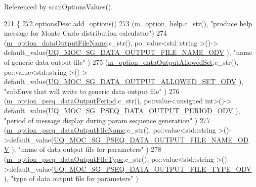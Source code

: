 Referenced by scan\-Options\-Values().


\begin{DoxyCode}
271 \{
272   optionsDesc.add\_options()     
273     (\hyperlink{class_q_u_e_s_o_1_1_monte_carlo_s_g_options_a604e9d58aa974b08eb38d70199c5d654}{m\_option\_help}.c\_str(),                                                                   
                                               \textcolor{stringliteral}{"produce help message for Monte Carlo distribution calculator"})
274     (\hyperlink{class_q_u_e_s_o_1_1_monte_carlo_s_g_options_a057b072e55710c5effa4a5016e1d93ab}{m\_option\_dataOutputFileName}.c\_str(),        po::value<std::string >()->
      default\_value(\hyperlink{_monte_carlo_s_g_options_8h_aa5ec0a1554b6c12eaa270131024b29b7}{UQ\_MOC\_SG\_DATA\_OUTPUT\_FILE\_NAME\_ODV}       ), \textcolor{stringliteral}{"name of generic
       data output file"}                            )
275     (\hyperlink{class_q_u_e_s_o_1_1_monte_carlo_s_g_options_a169218cf0b3d8d8035bb826a963f5e11}{m\_option\_dataOutputAllowedSet}.c\_str(),      po::value<std::string >()->
      default\_value(\hyperlink{_monte_carlo_s_g_options_8h_aa0fd860d2c6fd2693213b91c9bf69fcf}{UQ\_MOC\_SG\_DATA\_OUTPUT\_ALLOWED\_SET\_ODV}     ), \textcolor{stringliteral}{"subEnvs that
       will write to generic data output file"}         )
276     (\hyperlink{class_q_u_e_s_o_1_1_monte_carlo_s_g_options_a38f56157a49d08a3fd6a837d95250f8b}{m\_option\_pseq\_dataOutputPeriod}.c\_str(),     po::value<unsigned int>()->
      default\_value(\hyperlink{_monte_carlo_s_g_options_8h_ad65a13367ee1f95b0ddc5fca2f6dbf95}{UQ\_MOC\_SG\_PSEQ\_DATA\_OUTPUT\_PERIOD\_ODV}     ), \textcolor{stringliteral}{"period of
       message display during param sequence generation"}  )
277     (\hyperlink{class_q_u_e_s_o_1_1_monte_carlo_s_g_options_a52759ecc968b903de4d651127f6e9a03}{m\_option\_pseq\_dataOutputFileName}.c\_str(),   po::value<std::string >()-
      >default\_value(\hyperlink{_monte_carlo_s_g_options_8h_a773952b5a26845f50d913143236adbdf}{UQ\_MOC\_SG\_PSEQ\_DATA\_OUTPUT\_FILE\_NAME\_ODV}  ), \textcolor{stringliteral}{"name of
       data output file for parameters"}                     )
278     (\hyperlink{class_q_u_e_s_o_1_1_monte_carlo_s_g_options_af894e246867b1b73f66322df656c44c8}{m\_option\_pseq\_dataOutputFileType}.c\_str(),   po::value<std::string >()-
      >default\_value(\hyperlink{_monte_carlo_s_g_options_8h_a1f174a6cc09ec8585fabb3c5348d489b}{UQ\_MOC\_SG\_PSEQ\_DATA\_OUTPUT\_FILE\_TYPE\_ODV}  ), \textcolor{stringliteral}{"type of
       data output file for parameters"}                     )

\end{DoxyCode}
